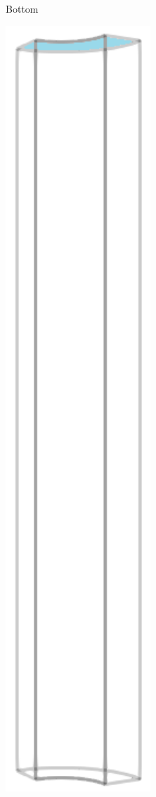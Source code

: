 \begin{figure}[!htb]
\begin{subfigure}[b]{0.16\textwidth}
    \caption{Bottom}
  \end{subfigure}
  \begin{subfigure}[b]{0.16\textwidth}
    \centering
    \includegraphics[width=0.6\textwidth]{Chapter5/figures/spallation/geometry_top}

\end{subfigure}
\end{figure}

